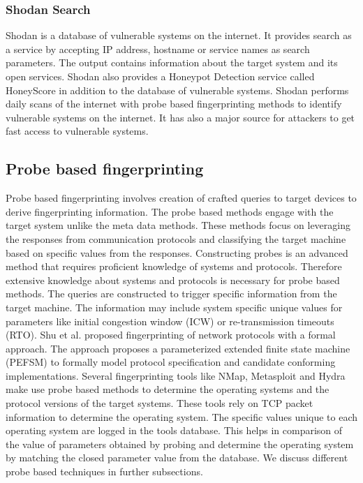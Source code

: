 \documentclass[letterpaper, 10 pt, conference]{ieeeconf}  %
\begin{document}
\subsubsection{Shodan Search}
Shodan is a database of vulnerable systems on the internet. It provides search as a service by accepting IP address, hostname or service names as search parameters. The output contains information about the target system and its open services. Shodan also provides a Honeypot Detection service called HoneyScore \cite{SHODAN} in addition to the database of vulnerable systems. Shodan performs daily scans of the internet with probe based fingerprinting methods to identify vulnerable systems on the internet. It has also a major source for attackers to get fast access to vulnerable systems. 
\newline
\subsection{Probe based fingerprinting}
Probe based fingerprinting involves creation of crafted queries to target devices to derive fingerprinting information. The probe based methods engage with  the target system unlike the meta data methods. These methods focus on leveraging the responses from communication protocols and classifying the target machine based on specific values from the responses. Constructing probes is an advanced method that requires proficient knowledge of systems and protocols. Therefore extensive knowledge about systems and protocols is necessary for probe based methods. The queries are constructed to trigger specific information from the target machine. The information may include system specific unique values for parameters like initial congestion window (ICW) or re-transmission timeouts (RTO). 
Shu et al.\cite{shu2006network} proposed fingerprinting of network protocols with a formal approach. The approach proposes a parameterized extended finite state machine (PEFSM) to formally model protocol specification and candidate conforming implementations. Several fingerprinting tools like NMap, Metasploit and Hydra make use probe based  methods to determine the operating systems and the protocol versions of the target systems. These tools rely on TCP packet information to determine the operating system. The specific values unique to each operating system are logged in  the tools database. This helps in comparison of the value of parameters obtained by probing and determine the operating system by matching the closed parameter value from the database. We discuss different probe based techniques in further subsections. 
\newline
\end{document}
